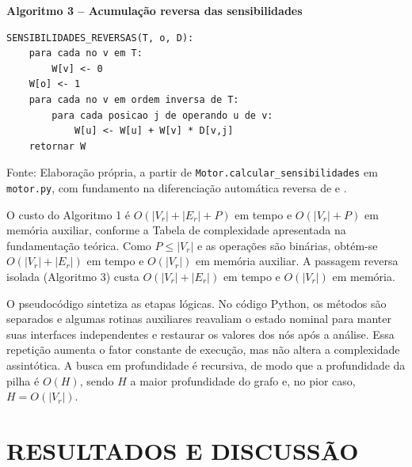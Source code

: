 \documentclass[12pt,openright,oneside,a4paper,brazil]{abntex2}
\begin{document}
\begin{center}
\begin{minipage}{0.96\textwidth}
\small
\textbf{Algoritmo 3 -- Acumulação reversa das sensibilidades}\par
\begin{verbatim}
SENSIBILIDADES_REVERSAS(T, o, D):
    para cada no v em T:
        W[v] <- 0
    W[o] <- 1
    para cada no v em ordem inversa de T:
        para cada posicao j de operando u de v:
            W[u] <- W[u] + W[v] * D[v,j]
    retornar W
\end{verbatim}
\end{minipage}
\end{center}
{\footnotesize Fonte: Elaboração própria, a partir de \texttt{Motor.calcular\_sensibilidades} em \texttt{motor.py}, com fundamento na diferenciação automática reversa de  e .}\par

O custo do Algoritmo 1 é $O(|V_r|+|E_r|+P)$ em tempo e $O(|V_r|+P)$ em memória auxiliar, conforme a Tabela de complexidade apresentada na fundamentação teórica. Como $P\leq |V_r|$ e as operações são binárias, obtém-se $O(|V_r|+|E_r|)$ em tempo e $O(|V_r|)$ em memória auxiliar. A passagem reversa isolada (Algoritmo 3) custa $O(|V_r|+|E_r|)$ em tempo e $O(|V_r|)$ em memória.

O pseudocódigo sintetiza as etapas lógicas. No código Python, os métodos são separados e algumas rotinas auxiliares reavaliam o estado nominal para manter suas interfaces independentes e restaurar os valores dos nós após a análise. Essa repetição aumenta o fator constante de execução, mas não altera a complexidade assintótica. A busca em profundidade é recursiva, de modo que a profundidade da pilha é $O(H)$, sendo $H$ a maior profundidade do grafo e, no pior caso, $H=O(|V_r|)$.

\chapter{RESULTADOS E DISCUSSÃO}
\end{document}
